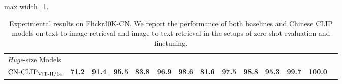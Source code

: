 \begin{table}[t]
\begin{adjustbox}{max width=1.\textwidth}
\begin{tabular}{@{\extracolsep{\fill}}lccccccccccccc}
    \\
\midrule
    \multicolumn{9}{l}{\textit{Huge}-size Models} \\
    $\text{CN-CLIP}\rm_{ViT\text{-}H/14}$
    & \textbf{71.2}	& \textbf{91.4}	& \textbf{95.5}	& \textbf{83.8}	& \textbf{96.9}	& \textbf{98.6}	& \textbf{81.6}	& \textbf{97.5}	& \textbf{98.8}	& \textbf{95.3}	& \textbf{99.7}	& \textbf{100.0}
    \\
\bottomrule
\end{tabular}
\end{adjustbox}
\caption{Experimental results on Flickr30K-CN. We report the performance of both baselines and Chinese CLIP models on text-to-image retrieval and image-to-text retrieval in the setups of zero-shot evaluation and finetuning. }
\label{tb:flickr}
\end{table}


